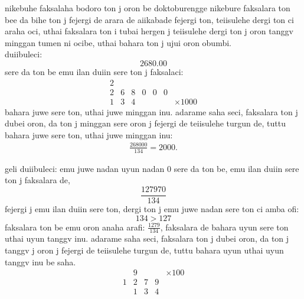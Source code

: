 \documentclass{report}
\begin{document}
nikebuhe faksalaha bodoro ton j oron be doktoburengge nikebure faksalara ton bee da bihe ton j fejergi de arara de aiikabade fejergi ton, teiisulehe dergi ton ci araha oci, uthai faksalara ton i tubai hergen j teiisulehe dergi ton j oron tanggv minggan tumen ni ocibe, uthai bahara ton j ujui oron obumbi.\\
\newpage
duiibuleci:
\[
    2680.00
\]
sere da ton be emu ilan duiin sere ton j faksalaci:
\[
    \begin{array}{|lllllll}
        2&&&&&&\\\hline
        2&6&8&0&0&0 &\\
        1&3&4& & &  &\times 1000
    \end{array}
\]
bahara juwe sere ton, uthai juwe minggan inu. adarame saha seci, faksalara ton j dubei oron, da ton j minggan sere oron j fejergi de teiisulehe turgun de, tuttu bahara juwe sere ton, uthai juwe minggan inu:
\begin{align*}
    \frac{268000}{134} = 2000.
\end{align*}

geli duiibuleci: emu juwe nadan uyun nadan 0 sere da ton be, emu ilan duiin sere ton j faksalara de, 
\[
    \frac{127970}{134}
\]
fejergi j emu ilan duiin sere ton, dergi ton j emu juwe nadan sere ton ci amba ofi:
\[
    134>127
\]
faksalara ton be emu oron anaha arafi: $\frac{1279}{134}$, faksalara de bahara uyun sere ton uthai uyun tanggv inu. adarame saha seci, faksalara ton j dubei oron, da ton j tanggv j oron j fejergi de teiisulehe turgun de, tuttu bahara uyun uthai uyun tanggv inu be saha.
\[
    \begin{array}{|lllll}
        & 9 & & & \times 100\\\hline
        1&2&7&9 & \\
        &1&3&4  &
    \end{array}
\]

\end{document}
